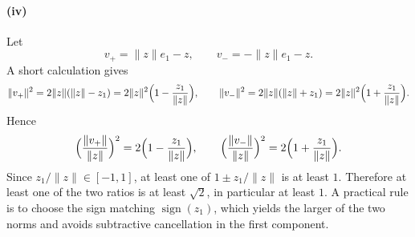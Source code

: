 \documentclass[11pt]{article}
\begin{document}
\paragraph{(iv)}
Let
\[
v_{+}=\|z\|e_1-z,\qquad v_{-}=-\|z\|e_1-z.
\]
A short calculation gives
\[
\|v_{+}\|^{2}=2\|z\|(\|z\|-z_1)=2\|z\|^{2}\Bigl(1-\frac{z_1}{\|z\|}\Bigr),
\qquad
\|v_{-}\|^{2}=2\|z\|(\|z\|+z_1)=2\|z\|^{2}\Bigl(1+\frac{z_1}{\|z\|}\Bigr).
\]
Hence
\[
\Bigl(\frac{\|v_{+}\|}{\|z\|}\Bigr)^{2}=2\Bigl(1-\frac{z_1}{\|z\|}\Bigr),\qquad
\Bigl(\frac{\|v_{-}\|}{\|z\|}\Bigr)^{2}=2\Bigl(1+\frac{z_1}{\|z\|}\Bigr).
\]
Since \(z_1/\|z\|\in[-1,1]\), at least one of \(1\pm z_1/\|z\|\) is at least \(1\). Therefore at least one of the two ratios is at least \(\sqrt{2}\), in particular at least \(1\). A practical rule is to choose the sign matching \(\operatorname{sign}(z_1)\), which yields the larger of the two norms and avoids subtractive cancellation in the first component.
\end{document}

